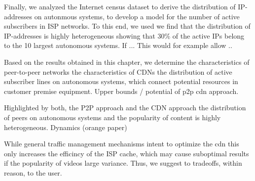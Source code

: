 Finally, we analyzed the Internet census dataset to derive the distribution of IP-addresses on autonmous systems, to develop a model for the number of active subscribers in ISP networks.
To this end, we used 
we find that the distribution of IP-addresses is highly heterogeneous showing that 30\% of the active IPs belong to the 10 largest autonomous systems.
If ...
This would for example allow ..

Based on the results obtained in this chapter, we determine
the characteristics of peer-to-peer networks
the characteristics of CDNs
the distribution of active subscriber lines on autonomous systems, which connect potential resources in customer premise equipment.
Upper bounds / potential of p2p cdn approach.

Highlighted by both, the P2P approach and the CDN approach the distribution of peers on autonomous systems and the popularity of content is highly heterogeneous.
Dynamics (orange paper)

While general traffic management mechanisms intent to optimize the cdn
this only increases the efficincy of the ISP cache, which may cause suboptimal results if the popularity of videos large variance.
Thus, we suggest to  tradeoffs, within reason, to the user.
